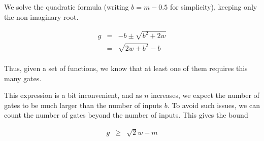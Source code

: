 \documentclass[12pt]{article}
\theoremstyle{definition}
\begin{document}
We solve the quadratic formula (writing $b = m-0.5$ for simplicity), keeping
only the non-imaginary root.

\begin{eqnarray*}
g & = & -b \pm \sqrt{ b^2 + 2w} \\
  & = & {\sqrt {2w + b^2}} - b \\
\end{eqnarray*}

Thus, given a set of functions, we know that at least one of them requires
this many gates.

This expression is a bit inconvenient, and as $n$ increases, we
expect the number of gates to be much larger than the number of
inputs $b$. To avoid such issues, we can count the number of gates
beyond the number of inputs. This gives the bound

\begin{eqnarray*}
g & \ge & {\sqrt 2w} - m \\
\end{eqnarray*}




\end{document}
